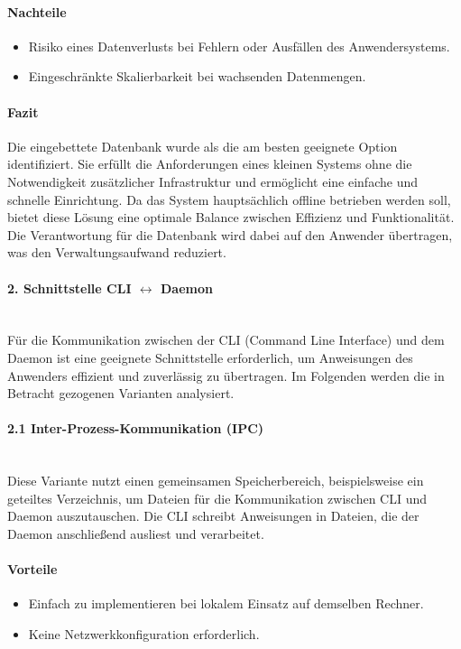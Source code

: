 \documentclass[a4paper,12pt]{report}
\begin{document}
    \paragraph{Nachteile}
    \begin{itemize}
        \item Risiko eines Datenverlusts bei Fehlern oder Ausfällen des Anwendersystems.
        \item Eingeschränkte Skalierbarkeit bei wachsenden Datenmengen.
    \end{itemize}

    \paragraph{Fazit}
    Die eingebettete Datenbank wurde als die am besten geeignete Option identifiziert.
    Sie erfüllt die Anforderungen eines kleinen Systems ohne die Notwendigkeit zusätzlicher Infrastruktur und ermöglicht eine einfache und schnelle Einrichtung.
    Da das System hauptsächlich offline betrieben werden soll, bietet diese Lösung eine optimale Balance zwischen Effizienz und Funktionalität.
    Die Verantwortung für die Datenbank wird dabei auf den Anwender übertragen, was den Verwaltungsaufwand reduziert.

    \paragraph{2. Schnittstelle CLI $\leftrightarrow$ Daemon}\mbox{}\\
    Für die Kommunikation zwischen der CLI (Command Line Interface) und dem Daemon ist eine geeignete Schnittstelle erforderlich, um Anweisungen des Anwenders effizient und zuverlässig zu übertragen.
    Im Folgenden werden die in Betracht gezogenen Varianten analysiert.

    \paragraph{2.1 Inter-Prozess-Kommunikation (IPC)}\mbox{}\\
    Diese Variante nutzt einen gemeinsamen Speicherbereich, beispielsweise ein geteiltes Verzeichnis, um Dateien für die Kommunikation zwischen CLI und Daemon auszutauschen.
    Die CLI schreibt Anweisungen in Dateien, die der Daemon anschließend ausliest und verarbeitet.

    \paragraph{Vorteile}
    \begin{itemize}
        \item Einfach zu implementieren bei lokalem Einsatz auf demselben Rechner.
        \item Keine Netzwerkkonfiguration erforderlich.
    \end{itemize}
\end{document}
